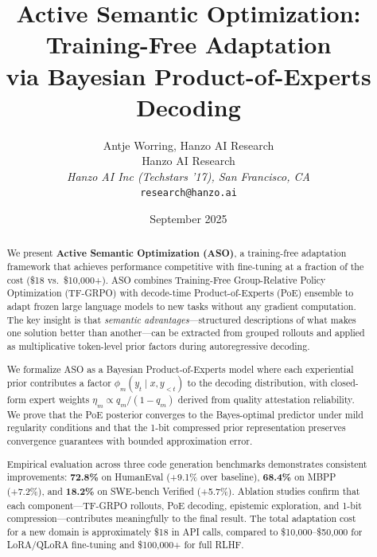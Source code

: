 \documentclass[11pt]{article}
\title{Active Semantic Optimization: Training-Free Adaptation\\via Bayesian Product-of-Experts Decoding}
\author{
    Antje Worring, Hanzo AI Research \\
    Hanzo AI Research\\
    \textit{Hanzo AI Inc (Techstars '17), San Francisco, CA}\\
    \texttt{research@hanzo.ai}
}
\date{September 2025}
\begin{document}
\hanzocoverpage

\begin{abstract}
We present \textbf{Active Semantic Optimization (ASO)}, a training-free adaptation
framework that achieves performance competitive with fine-tuning at a fraction of
the cost (\$18 vs.\ \$10{,}000+). ASO combines Training-Free Group-Relative Policy
Optimization (TF-GRPO) with decode-time Product-of-Experts (PoE) ensemble to
adapt frozen large language models to new tasks without any gradient computation.
The key insight is that \emph{semantic advantages}---structured descriptions of
what makes one solution better than another---can be extracted from grouped
rollouts and applied as multiplicative token-level prior factors during
autoregressive decoding.

We formalize ASO as a Bayesian Product-of-Experts model where each experiential
prior contributes a factor $\phi_m(y_t \mid x, y_{<t})$ to the decoding
distribution, with closed-form expert weights $\eta_m \propto q_m / (1 - q_m)$
derived from quality attestation reliability. We prove that the PoE posterior
converges to the Bayes-optimal predictor under mild regularity conditions and
that the 1-bit compressed prior representation preserves convergence guarantees
with bounded approximation error.

Empirical evaluation across three code generation benchmarks demonstrates
consistent improvements: \textbf{72.8\%} on HumanEval (+9.1\% over baseline),
\textbf{68.4\%} on MBPP (+7.2\%), and \textbf{18.2\%} on SWE-bench Verified
(+5.7\%). Ablation studies confirm that each component---TF-GRPO rollouts, PoE
decoding, epistemic exploration, and 1-bit compression---contributes
meaningfully to the final result. The total adaptation cost for a new domain is
approximately \$18 in API calls, compared to \$10{,}000--\$50{,}000 for
LoRA/QLoRA fine-tuning and \$100{,}000+ for full RLHF.
\end{abstract}

















\end{document}
